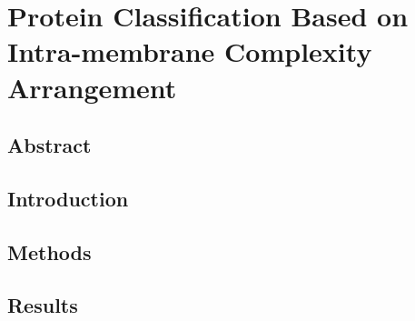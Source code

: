 
\chapter{Protein Classification Based on Intra-membrane Complexity Arrangement} %
\section{Abstract}
\section{Introduction}
\section{Methods}
\section{Results}
